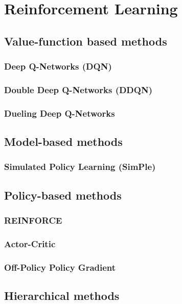 \documentclass{article}
\begin{document}
\section{Reinforcement Learning}

\subsection{Value-function based methods}

\subsubsection{Deep Q-Networks (DQN)}

\subsubsection{Double Deep Q-Networks (DDQN)}

\subsubsection{Dueling Deep Q-Networks}

\subsection{Model-based methods}

\subsubsection{Simulated Policy Learning (SimPle)}

\subsection{Policy-based methods}

\subsubsection{REINFORCE}

\subsubsection{Actor-Critic}

\subsubsection{Off-Policy Policy Gradient}

\subsection{Hierarchical methods}
\end{document}
